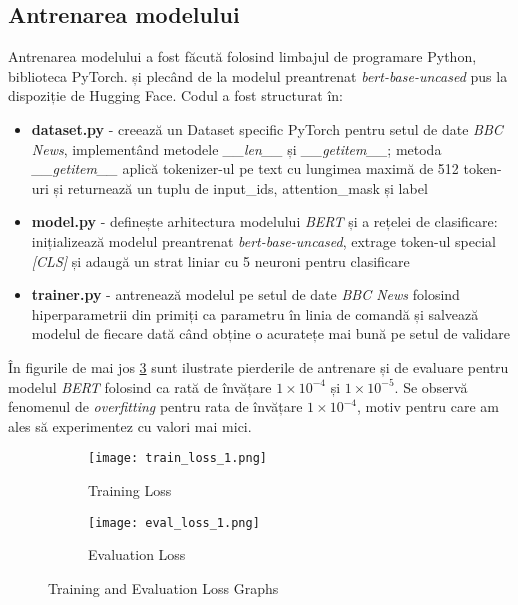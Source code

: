 \subsection{Antrenarea modelului}
\vspace{1em}
Antrenarea modelului a fost făcută folosind limbajul de programare Python, biblioteca PyTorch. \cite{paszke2019pytorch}
și plecând de la modelul preantrenat \textit{bert-base-uncased} pus la dispoziție de Hugging Face.
Codul a fost structurat în: 
\vspace{1em}

\begin{itemize}
    \item \textbf{dataset.py} - creează un Dataset specific PyTorch pentru setul de date \textit{BBC News},
    implementând metodele \textit{\_\_len\_\_} și \textit{\_\_getitem\_\_}; metoda \textit{\_\_getitem\_\_}
    aplică tokenizer-ul pe text cu lungimea maximă de 512 token-uri și returnează un tuplu de input\_ids,
    attention\_mask și label
    \item \textbf{model.py} - definește arhitectura modelului \textit{BERT} și a rețelei de clasificare:
    inițializează modelul preantrenat \textit{bert-base-uncased}, extrage token-ul special \textit{[CLS]}
    și adaugă un strat liniar cu 5 neuroni pentru clasificare
    \item \textbf{trainer.py} - antrenează modelul pe setul de date \textit{BBC News} folosind hiperparametrii
    din primiți ca parametru în linia de comandă și salvează modelul de fiecare dată când obține o
    acuratețe mai bună pe setul de validare
\end{itemize}

\vspace{1em}

\par
În figurile de mai jos \ref{fig:loss_graphs} sunt ilustrate pierderile de antrenare și de evaluare pentru modelul \textit{BERT}
folosind ca rată de învățare $1 \times 10^{-4}$ și $1 \times 10^{-5}$. Se observă fenomenul de \textit{overfitting}
pentru rata de învățare $1 \times 10^{-4}$, motiv pentru care am ales să experimentez cu valori mai mici.

\begin{figure}[ht]
    \centering
    \begin{subfigure}[b]{0.45\textwidth}
        \texttt{[image: train\_loss\_1.png]}
        \caption{Training Loss}
        \label{fig:train_loss}
    \end{subfigure}
    \hfill %
    \begin{subfigure}[b]{0.45\textwidth}
        \texttt{[image: eval\_loss\_1.png]}
        \caption{Evaluation Loss}
        \label{fig:eval_loss}
    \end{subfigure}
    \caption{Training and Evaluation Loss Graphs}
    \label{fig:loss_graphs}
\end{figure}
\vspace{1em}

